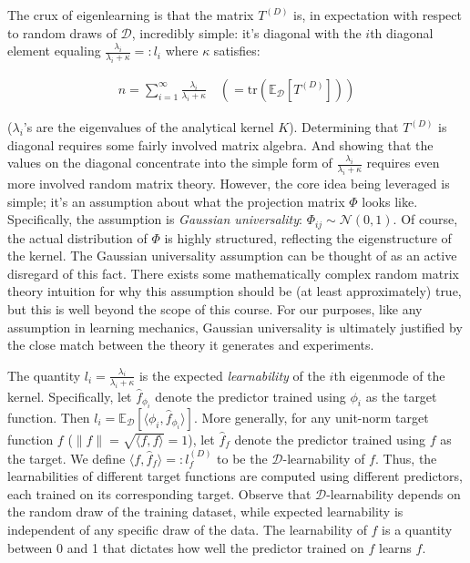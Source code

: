 The crux of eigenlearning is that the matrix $T^{(D)}$ is, in expectation with respect to random draws of $\mathcal{D}$, incredibly simple: it's diagonal with the $i$th diagonal element equaling $\frac{\lambda_i}{\lambda_i+\kappa}=: l_i$ where $\kappa$ satisfies:

\begin{align}
n=\sum^{\infty}_{i=1} \frac{\lambda_i}{\lambda_i+\kappa} \quad\left(=\text{tr}(\mathbb{E}_{\mathcal{D}}[T^{(D)}])\right)
\end{align}

($\lambda_i$'s are the eigenvalues of the analytical kernel $K$). Determining that $T^{(D)}$ is diagonal requires some fairly involved matrix algebra. And showing that the values on the diagonal concentrate into the simple form of $\frac{\lambda_i}{\lambda_i+\kappa}$ requires even more involved random matrix theory. However, the core idea being leveraged is simple; it's an assumption about what the projection matrix $\Phi$ looks like. Specifically, the assumption is \textit{Gaussian universality}: $\Phi_{ij}\sim\mathcal{N}(0,1)$. Of course, the actual distribution of $\Phi$ is highly structured, reflecting the eigenstructure of the kernel. The Gaussian universality assumption can be thought of as an active disregard of this fact. There exists some mathematically complex random matrix theory intuition for why this assumption should be (at least approximately) true, but this is well beyond the scope of this course. For our purposes, like any assumption in learning mechanics, Gaussian universality is ultimately justified by the close match between the theory it generates and experiments.

The quantity $l_i=\frac{\lambda_i}{\lambda_i+\kappa}$ is the expected \textit{learnability} of the $i$th eigenmode of the kernel. Specifically, let $\hat{f}_{\phi_i}$ denote the predictor trained using $\phi_i$ as the target function. Then $l_i=\mathbb{E}_{\mathcal{D}}\left[\langle \phi_i,\hat{f}_{\phi_i}\rangle\right]$. More generally, for any unit-norm target function $f$ ($\|f\| = \sqrt{\langle f,f\rangle}=1$), let $\hat{f}_f$ denote the predictor trained using $f$ as the target. We define $\langle f,\hat{f}_f\rangle=:l_f^{(D)}$ to be the $\mathcal{D}$-learnability of $f$. Thus, the learnabilities of different target functions are computed using different predictors, each trained on its corresponding target. Observe that $\mathcal{D}$-learnability depends on the random draw of the training dataset, while expected learnability is independent of any specific draw of the data. The learnability of $f$ is a quantity between 0 and 1 that dictates how well the predictor trained on $f$ learns $f$.

